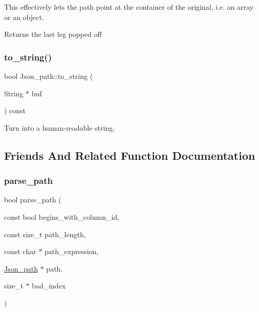 This effectively lets the path point at the container of the original, i.\+e. an array or an object.

\begin{DoxyReturn}{Returns}
the last leg popped off 
\end{DoxyReturn}
\mbox{\label{classJson__path_a894bbe4696c914f7274325b202fd6ccf}} 
\subsubsection{\texorpdfstring{to\+\_\+string()}{to\_string()}}
{\footnotesize\ttfamily bool Json\+\_\+path\+::to\+\_\+string (\begin{DoxyParamCaption}\item[{String $\ast$}]{buf }\end{DoxyParamCaption}) const}

Turn into a human-\/readable string. 

\subsection{Friends And Related Function Documentation}
\mbox{\label{classJson__path_a6b1ee97299114765938fde20aaa41018}} 
\subsubsection{\texorpdfstring{parse\+\_\+path}{parse\_path}}
{\footnotesize\ttfamily bool parse\+\_\+path (\begin{DoxyParamCaption}\item[{const bool}]{begins\+\_\+with\+\_\+column\+\_\+id,  }\item[{const size\+\_\+t}]{path\+\_\+length,  }\item[{const char $\ast$}]{path\+\_\+expression,  }\item[{\mbox{\hyperlink{classJson__path}{Json\+\_\+path}} $\ast$}]{path,  }\item[{size\+\_\+t $\ast$}]{bad\+\_\+index }\end{DoxyParamCaption})\hspace{0.3cm}{\ttfamily [friend]}}


